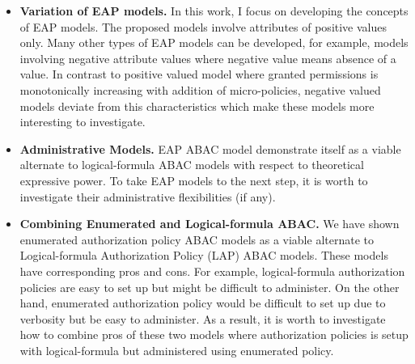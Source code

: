 \begin{itemize}
	
	\item\textbf{ {Variation of EAP models.}} In this work, I focus on developing the concepts of EAP models. The proposed models involve  attributes of positive values only. Many other types of EAP models can be developed, for example, models involving negative attribute values where negative value means absence of a value. In contrast to positive valued model where granted permissions is monotonically increasing with addition of micro-policies, negative valued models deviate from this characteristics which make these models more interesting to investigate.
	
	\item \textbf{{Administrative Models.}} EAP ABAC model demonstrate itself as a viable alternate to logical-formula ABAC models with respect to theoretical expressive power. To take EAP  models to the next step, it is worth to investigate their administrative flexibilities (if any).
	
	\item \textbf{ Combining Enumerated and Logical-formula ABAC.} We have shown enumerated authorization policy ABAC models as a viable alternate to Logical-formula Authorization Policy (LAP) ABAC models. These models have corresponding pros and cons. For example, logical-formula authorization policies are easy to set up but might be difficult to administer. On the other hand, enumerated authorization policy would be difficult to set up due to verbosity but be easy to administer. As a result, it is worth to investigate how to combine pros of these two models where authorization policies is setup with logical-formula but administered using enumerated policy. 	
\end{itemize}

 